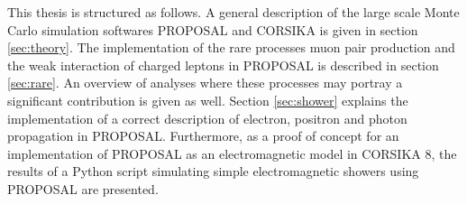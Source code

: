 This thesis is structured as follows.
A general description of the large scale Monte Carlo simulation softwares PROPOSAL and CORSIKA is given in section \ref{sec:theory}.
The implementation of the rare processes muon pair production and the weak interaction of charged leptons in PROPOSAL is described in section \ref{sec:rare}.
An overview of analyses where these processes may portray a significant contribution is given as well.
Section \ref{sec:shower} explains the implementation of a correct description of electron, positron and photon propagation in PROPOSAL.
Furthermore, as a proof of concept for an implementation of PROPOSAL as an electromagnetic model in CORSIKA 8, the results of a Python script simulating simple electromagnetic showers using PROPOSAL are presented.